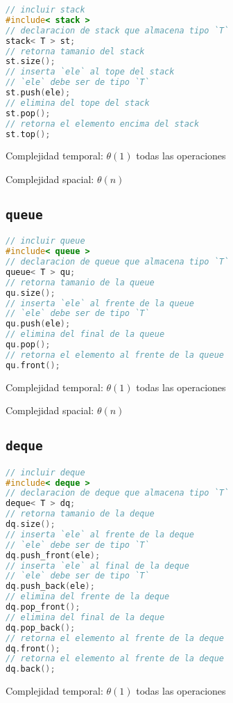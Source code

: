\documentclass{article}
\begin{document}
\begin{multicols}{2}
\begin{lstlisting}[language=C++]
// incluir stack
#include< stack >
// declaracion de stack que almacena tipo `T`
stack< T > st; 
// retorna tamanio del stack
st.size(); 
// inserta `ele` al tope del stack
// `ele` debe ser de tipo `T`
st.push(ele); 
// elimina del tope del stack
st.pop(); 
// retorna el elemento encima del stack
st.top();
\end{lstlisting}

Complejidad temporal: $\theta(1)$ todas las operaciones

Complejidad spacial: $\theta(n)$ 

\columnbreak
\subsection*{\tt \footnotesize queue}

\begin{lstlisting}[language=C++]
// incluir queue
#include< queue >
// declaracion de queue que almacena tipo `T`
queue< T > qu; 
// retorna tamanio de la queue
qu.size(); 
// inserta `ele` al frente de la queue
// `ele` debe ser de tipo `T`
qu.push(ele); 
// elimina del final de la queue
qu.pop(); 
// retorna el elemento al frente de la queue
qu.front();
\end{lstlisting}

Complejidad temporal: $\theta(1)$ todas las operaciones

Complejidad spacial: $\theta(n)$ 

\subsection*{\tt \footnotesize deque}

\begin{lstlisting}[language=C++]
// incluir deque
#include< deque >
// declaracion de deque que almacena tipo `T`
deque< T > dq; 
// retorna tamanio de la deque
dq.size(); 
// inserta `ele` al frente de la deque
// `ele` debe ser de tipo `T`
dq.push_front(ele); 
// inserta `ele` al final de la deque
// `ele` debe ser de tipo `T`
dq.push_back(ele); 
// elimina del frente de la deque
dq.pop_front(); 
// elimina del final de la deque
dq.pop_back(); 
// retorna el elemento al frente de la deque
dq.front();
// retorna el elemento al frente de la deque
dq.back();
\end{lstlisting}

Complejidad temporal: $\theta(1)$ todas las operaciones


\end{multicols}
\end{document}
